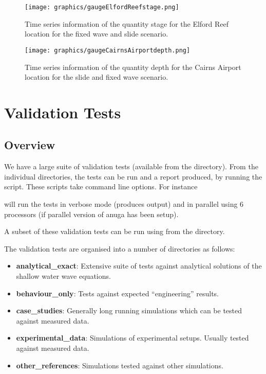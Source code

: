 \documentclass{manual}
\begin{document}
\begin{figure}[htp]
  \centerline{\texttt{[image: graphics/gaugeElfordReefstage.png]}}
  \caption{Time series information of the quantity stage for the Elford Reef location for the
           fixed wave and slide scenario.}
  \label{fig:reef}
\end{figure}

\begin{figure}[htp]
  \centerline{\texttt{[image: graphics/gaugeCairnsAirportdepth.png]}}
  \caption{Time series information of the quantity depth for the Cairns Airport
           location for the slide and fixed wave scenario.}
  \label{fig:airportboth}
\end{figure}



\chapter{\anuga Validation Tests}


\section{Overview}

We have a large suite of validation tests (available from the  directory). From the individual directories, the tests can be run and a report produced, by running the  script. These scripts take command line options. For instance


will run the tests in verbose mode (produces output) and in parallel using 6 processors (if parallel version of anuga has been setup).

A subset of these validation tests can be run using  from the  directory.


The validation tests are organised into a number of directories as follows:

\begin{itemize}
\item \textbf{analytical\_exact}: Extensive suite of tests against analytical solutions of the shallow water wave equations.

\item \textbf{behaviour\_only}: Tests against expected ``engineering'' results.

\item \textbf{case\_studies}: Generally long running simulations which can be tested against measured data.

\item \textbf{experimental\_data}: Simulations of experimental setups. Usually tested against measured data.

\item \textbf{other\_references}: Simulations tested against other simulations.
\end{itemize}
\end{document}
